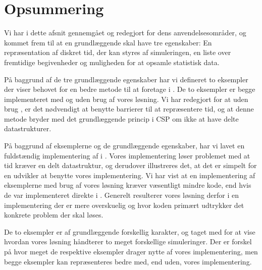 \section{Opsummering}
Vi har i dette afsnit gennemgået \des og redegjort for dens anvendelsesområder, og kommet frem til at en \des grundlæggende skal have tre egenskaber: En repræsentation af diskret tid, der kan styres af simuleringen, en liste over fremtidige begivenheder og muligheden for at opsamle statistisk data. 

På baggrund af de tre grundlæggende egenskaber har vi defineret to eksempler der viser behovet for en bedre metode til at foretage \des i \pycsp. 
De to eksempler er begge implementeret med og uden brug af vores \des løsning. Vi har redegjort for at uden brug \des, er det nødvendigt at benytte barrierer til at repræsentere tid, og at denne metode bryder med det grundlæggende princip i CSP om ikke at have delte datastrukturer. 

På baggrund af eksemplerne og de grundlæggende egenskaber, har vi lavet en fuldstændig implementering af \des i \pycsp.
Vores implementering løser problemet med at tid kræver en delt datastruktur, og derudover illustreres det, at det er simpelt for en udvikler at benytte vores implementering. 
 Vi har vist  at en implementering af eksemplerne med brug af vores løsning kræver væsentligt mindre kode, end hvis de var implementeret direkte i \pycsp. Generelt resulterer vores løsning derfor i en implementering der er mere overskuelig og hvor koden primært udtrykker det konkrete problem der skal løses. 

De to eksempler er af grundlæggende forskellig karakter, og taget med for at vise hvordan vores løsning håndterer to meget forskellige simuleringer. Der er forskel på hvor meget de respektive eksempler drager nytte af vores implementering, men begge eksempler kan repræsenteres bedre med, end uden, vores implementering. 

